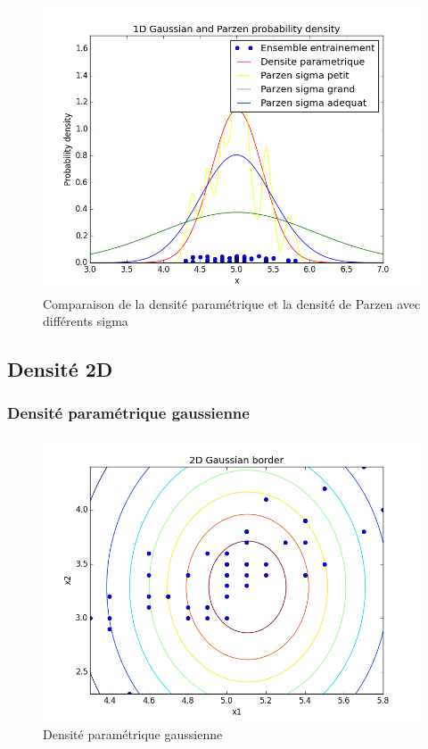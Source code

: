 \documentclass[a4paper,10pt]{article}
\begin{document}
\begin{figure}[H]
	\includegraphics[width=12cm]{images/1D_Gaussian_and_Parzen_probability_density.png} 
	\centering
	\caption{Comparaison de la densité paramétrique et la densité de Parzen avec différents sigma}
	\label{fig:comp}
\end{figure}

\subsection{Densité 2D}

\subsubsection{Densité paramétrique gaussienne}
\begin{figure}[H]
	\includegraphics[width=12cm]{images/2D_Gaussian_border.png} 
	\centering
	\caption{Densité paramétrique gaussienne}
	\label{fig:comp}
\end{figure}
\end{document}
